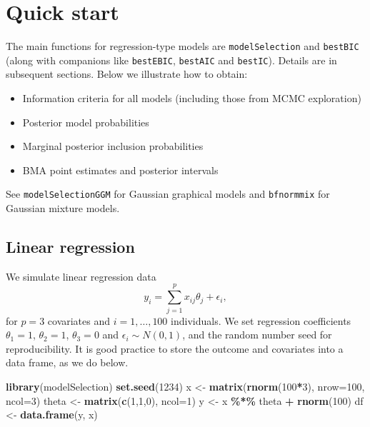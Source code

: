 \documentclass[
]{book}
\newenvironment{Shaded}{\begin{snugshade}}{\end{snugshade}}
\newcommand{\AttributeTok}[1]{\textcolor[rgb]{0.13,0.29,0.53}{#1}}
\newcommand{\DecValTok}[1]{\textcolor[rgb]{0.00,0.00,0.81}{#1}}
\newcommand{\FunctionTok}[1]{\textcolor[rgb]{0.13,0.29,0.53}{\textbf{#1}}}
\newcommand{\NormalTok}[1]{#1}
\newcommand{\OtherTok}[1]{\textcolor[rgb]{0.56,0.35,0.01}{#1}}
\newcommand{\SpecialCharTok}[1]{\textcolor[rgb]{0.81,0.36,0.00}{\textbf{#1}}}
\providecommand{\tightlist}{%
  \setlength{\itemsep}{0pt}\setlength{\parskip}{0pt}}
\theoremstyle{definition}
\theoremstyle{definition}
\theoremstyle{definition}
\theoremstyle{definition}
\theoremstyle{remark}
\begin{document}
\chapter{Quick start}\label{quick-start}

The main functions for regression-type models are \texttt{modelSelection} and \texttt{bestBIC} (along with companions like \texttt{bestEBIC}, \texttt{bestAIC} and \texttt{bestIC}).
Details are in subsequent sections. Below we illustrate how to obtain:

\begin{itemize}
\tightlist
\item
  Information criteria for all models (including those from MCMC exploration)
\item
  Posterior model probabilities
\item
  Marginal posterior inclusion probabilities\\
\item
  BMA point estimates and posterior intervals
\end{itemize}

See \texttt{modelSelectionGGM} for Gaussian graphical models and \texttt{bfnormmix} for Gaussian mixture models.

\section{Linear regression}\label{linear-regression}

We simulate linear regression data
\[
y_i = \sum_{j=1}^p x_{ij} \theta_j + \epsilon_i,
\]
for \(p=3\) covariates and \(i=1,\ldots,100\) individuals.
We set regression coefficients \(\theta_1= 1\), \(\theta_2= 1\), \(\theta_3=0\) and \(\epsilon_i \sim N(0,1)\), and the random number seed for reproducibility.
It is good practice to store the outcome and covariates into a data frame, as we do below.

\begin{Shaded}
\begin{Highlighting}[]
\FunctionTok{library}\NormalTok{(modelSelection)}
\FunctionTok{set.seed}\NormalTok{(}\DecValTok{1234}\NormalTok{)}
\NormalTok{x }\OtherTok{\textless{}{-}} \FunctionTok{matrix}\NormalTok{(}\FunctionTok{rnorm}\NormalTok{(}\DecValTok{100}\SpecialCharTok{*}\DecValTok{3}\NormalTok{), }\AttributeTok{nrow=}\DecValTok{100}\NormalTok{, }\AttributeTok{ncol=}\DecValTok{3}\NormalTok{)}
\NormalTok{theta }\OtherTok{\textless{}{-}} \FunctionTok{matrix}\NormalTok{(}\FunctionTok{c}\NormalTok{(}\DecValTok{1}\NormalTok{,}\DecValTok{1}\NormalTok{,}\DecValTok{0}\NormalTok{), }\AttributeTok{ncol=}\DecValTok{1}\NormalTok{)}
\NormalTok{y }\OtherTok{\textless{}{-}}\NormalTok{ x }\SpecialCharTok{\%*\%}\NormalTok{ theta }\SpecialCharTok{+} \FunctionTok{rnorm}\NormalTok{(}\DecValTok{100}\NormalTok{)}
\NormalTok{df }\OtherTok{\textless{}{-}} \FunctionTok{data.frame}\NormalTok{(y, x)}
\end{Highlighting}
\end{Shaded}
\end{document}
